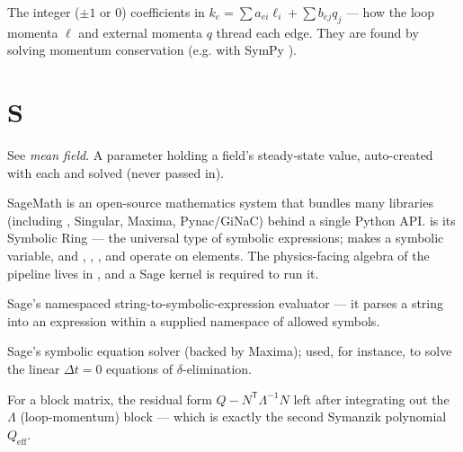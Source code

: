 \begin{description}[leftmargin=0pt,style=nextline]
  \item[Routing coefficients $(a_e,b_e)$] The integer ($\pm 1$ or $0$) coefficients
        in $k_e=\sum a_{ei}\ell_i+\sum b_{ej}q_j$ --- how the loop momenta $\ell$ and
        external momenta $q$ thread each edge. They are found by solving momentum
        conservation (e.g. with SymPy ).

\end{description}

\section*{S}
\begin{description}[leftmargin=0pt,style=nextline]

  \item[Saddle / mean-field parameter] See \emph{mean field}. A 
        parameter holding a field's steady-state value, auto-created with each
         and solved (never passed in).

  \item[SageMath / \code{SR} (Symbolic Ring)] SageMath is an open-source mathematics
        system that bundles many libraries (including , Singular, Maxima,
        Pynac/GiNaC) behind a single Python API.  is its Symbolic Ring ---
        the universal type of symbolic expressions;  makes a
        symbolic variable, and , , , and
         operate on  elements. The physics-facing algebra of the
        pipeline lives in , and a Sage kernel is required to run it.

  \item[\code{sage\_eval}] Sage's namespaced string-to-symbolic-expression evaluator
        --- it parses a string into an  expression within a supplied
        namespace of allowed symbols.

  \item[\code{sage\_solve}] Sage's symbolic equation solver (backed by Maxima); used,
        for instance, to solve the linear $\Delta t=0$ equations of
        $\delta$-elimination.

  \item[Schur complement] For a block matrix, the residual form
        $Q-N^{\mathsf T}\Lambda^{-1}N$ left after integrating out the $\Lambda$
        (loop-momentum) block --- which is exactly the second Symanzik polynomial
        $Q_{\mathrm{eff}}$.


\end{description}
